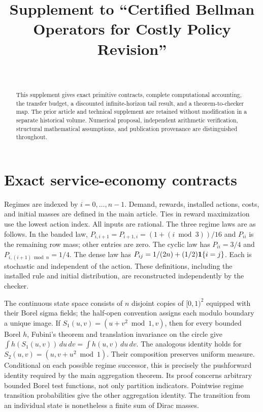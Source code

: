 
\setlength{\tabcolsep}{3pt}

\begin{frontmatter}
\title{Supplement to ``Certified Bellman Operators for Costly Policy Revision''}
\begin{aug}\author[id=au1,addressref={add1}]{~}\address[id=add1]{}\end{aug}
\begin{abstract}This supplement gives exact primitive contracts, complete computational accounting, the transfer budget, a discounted infinite-horizon tail result, and a theorem-to-checker map. The prior article and technical supplement are retained without modification in a separate historical volume. Numerical proposal, independent arithmetic verification, structural mathematical assumptions, and publication provenance are distinguished throughout.\end{abstract}
\end{frontmatter}



\section{Exact service-economy contracts}
Regimes are indexed by $i=0,\ldots,n-1$. Demand, rewards, installed actions, costs, and initial masses are defined in the main article. Ties in reward maximization use the lowest action index. All inputs are rational. The three regime laws are as follows. In the banded law, $P_{i,i+1}=P_{i+1,i}=(1+(i\bmod3))/16$ and $P_{ii}$ is the remaining row mass; other entries are zero. The cyclic law has $P_{ii}=3/4$ and $P_{i,(i+1)\bmod n}=1/4$. The dense law has $P_{ij}=1/(2n)+(1/2)\mathbf 1\{i=j\}$. Each is stochastic and independent of the action. These definitions, including the installed rule and initial distribution, are reconstructed independently by the checker.

The continuous state space consists of $n$ disjoint copies of $[0,1)^2$ equipped with their Borel sigma fields; the half-open convention assigns each modulo boundary a unique image. If $S_1(u,v)=(u+v^2\bmod1,v)$, then for every bounded Borel $h$, Fubini's theorem and translation invariance on the circle give $\int h(S_1(u,v))\,du\,dv=\int h(u,v)\,du\,dv$. The analogous identity holds for $S_2(u,v)=(u,v+u^2\bmod1)$. Their composition preserves uniform measure. Conditional on each possible regime successor, this is precisely the pushforward identity required by the main aggregation theorem. Its proof concerns arbitrary bounded Borel test functions, not only partition indicators. Pointwise regime transition probabilities give the other aggregation identity. The transition from an individual state is nonetheless a finite sum of Dirac masses.

